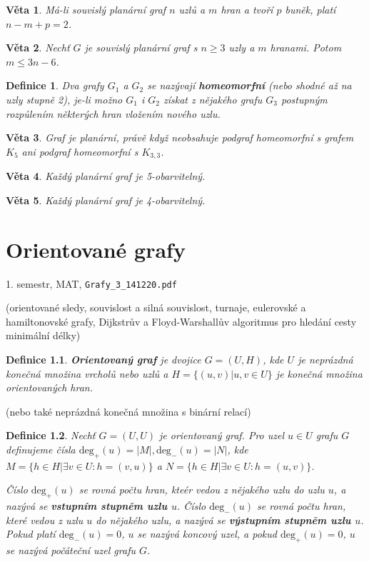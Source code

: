 \documentclass[a4paper, 11pt]{report}
\newtheorem{mydef}{Definice}[chapter]
\newtheorem{veta}{Věta}[chapter]
\begin{document}
\begin{veta}
Má-li souvislý planární graf $n$ uzlů a $m$ hran a tvoří $p$ buněk, platí $n-m+p = 2$.
\end{veta}

\begin{veta}
Nechť $G$ je souvislý planární graf s $n \geq 3$ uzly a $m$ hranami. Potom $m \leq 3n - 6$.
\end{veta}

\begin{mydef}
Dva grafy $G_1$ a $G_2$ se nazývají \textbf{homeomorfní} (nebo shodné až na uzly stupně 2), je-li možno $G_1$ i $G_2$ získat z nějakého grafu $G_3$ postupným rozpůlením některých hran vložením nového uzlu.
\end{mydef}

\begin{veta}
Graf je planární, právě když neobsahuje podgraf homeomorfní s grafem $K_5$ ani podgraf homeomorfní s $K_{3,3}$.
\end{veta}

\begin{veta}
Každý planární graf je 5-obarvitelný.
\end{veta}

\begin{veta}
Každý planární graf je 4-obarvitelný.
\end{veta}




\chapter{Orientované grafy} \label{cha:15}

1. semestr, MAT, \texttt{Grafy\_3\_141220.pdf}

(orientované sledy, souvislost a silná souvislost, turnaje, eulerovské a hamiltonovské grafy, Dijkstrův a Floyd-Warshallův algoritmus pro hledání cesty minimální délky)

\begin{mydef}
\textbf{Orientovaný graf} je dvojice $G=(U, H)$, kde $U$ je neprázdná konečná množina vrcholů nebo uzlů a $H=\{(u, v)|u, v \in U\}$ je konečná množina orientovaných hran.
\end{mydef}
(nebo také neprázdná konečná množina s binární relací)

\begin{mydef}
Nechť $G=(U, U)$ je orientovaný graf. Pro uzel $u \in U$ grafu $G$ definujeme čísla $\text{deg}_+(u) = |M|, \text{deg}_-(u) = |N|$, kde
$M = \{h \in H| \exists v \in U: h=(v, u)\}$ a
$N = \{h \in H| \exists v \in U: h=(u, v)\}$.

Číslo $\text{deg}_+(u)$ se rovná počtu hran, kteér vedou z nějakého uzlu do uzlu $u$, a nazývá se \textbf{vstupním stupněm uzlu $u$}. Číslo $\text{deg}_-(u)$ se rovná počtu hran, které vedou z uzlu $u$ do nějakého uzlu, a nazývá se \textbf{výstupním stupněm uzlu $u$}. Pokud platí $\text{deg}_-(u) = 0$, $u$ se nazývá koncový uzel, a pokud $\text{deg}_+(u) = 0$, $u$ se nazývá počáteční uzel grafu $G$.
\end{mydef}
\end{document}
